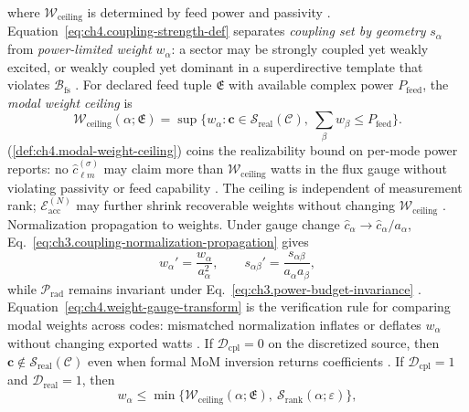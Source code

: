 where \(\mathcal{W}_{\mathrm{ceiling}}\) is determined by feed power and passivity \cite{stratton1941}.
Equation~\eqref{eq:ch4.coupling-strength-def} separates \emph{coupling set by geometry} \(s_{\alpha}\) from
\emph{power-limited weight} \(w_{\alpha}\): a sector may be strongly coupled yet weakly excited, or weakly coupled yet
dominant in a superdirective template that violates \(\mathcal{B}_{\mathrm{fs}}\) \cite{devaney2004}.
\label{def:ch4.modal-weight-ceiling}
For declared feed tuple \(\mathfrak{E}\) with available complex power \(P_{\mathrm{feed}}\), the \emph{modal weight
ceiling} is
\begin{equation}
\label{eq:ch4.modal-weight-ceiling}
\mathcal{W}_{\mathrm{ceiling}}(\alpha;\mathfrak{E})
=
\sup\big\{
w_{\alpha}:
\mathbf{c}\in\mathcal{S}_{\mathrm{real}}(\mathcal{C}),\ 
\sum_{\beta}w_{\beta}\le P_{\mathrm{feed}}
\big\}.
\end{equation}
(\ref{def:ch4.modal-weight-ceiling}) coins the realizability bound on per-mode power reports: no
\(\widehat{c}_{\ell m}^{(\sigma)}\) may claim more than \(\mathcal{W}_{\mathrm{ceiling}}\) watts in the flux gauge without
violating passivity or feed capability \cite{stratton1941}. The ceiling is independent of measurement rank;
\(\mathcal{E}_{\mathrm{acc}}^{(N)}\) may further shrink recoverable weights without changing
\(\mathcal{W}_{\mathrm{ceiling}}\) \cite{devaney2004}.
Normalization propagation to weights. Under gauge change \(\widehat{c}_{\alpha}\to\widehat{c}_{\alpha}/a_{\alpha}\),
Eq.~\eqref{eq:ch3.coupling-normalization-propagation} gives
\begin{equation}
\label{eq:ch4.weight-gauge-transform}
w_{\alpha}'=\frac{w_{\alpha}}{a_{\alpha}^{2}},
\qquad
s_{\alpha\beta}'=\frac{s_{\alpha\beta}}{a_{\alpha}a_{\beta}},
\end{equation}
while \(\mathcal{P}_{\mathrm{rad}}\) remains invariant under Eq.~\eqref{eq:ch3.power-budget-invariance}
\cite{hansen1988}. Equation~\eqref{eq:ch4.weight-gauge-transform} is the verification rule for
comparing modal weights across codes: mismatched normalization inflates or deflates \(w_{\alpha}\) without changing
exported watts \cite{harrington2001}.
\label{thm:ch4.coupling-weight-ceiling}
If \(\mathcal{D}_{\mathrm{cpl}}=0\) on the discretized source, then \(\mathbf{c}\notin\mathcal{S}_{\mathrm{real}}(\mathcal{C})\)
even when formal MoM inversion returns coefficients \cite{harrington2001}. If \(\mathcal{D}_{\mathrm{cpl}}=1\)
and \(\mathcal{D}_{\mathrm{real}}=1\), then
\begin{equation}
\label{eq:ch4.weight-ceiling-bound}
w_{\alpha}
\le
\min\Big\{
\mathcal{W}_{\mathrm{ceiling}}(\alpha;\mathfrak{E}),\ 
\mathcal{S}_{\mathrm{rank}}(\alpha;\varepsilon)
\Big\},
\end{equation}
